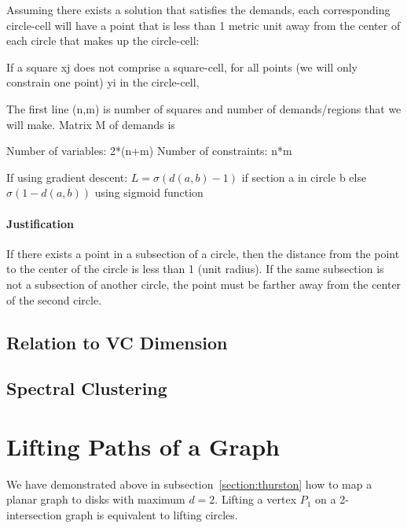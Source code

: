 \documentclass{NSF}
\begin{document}
\begin{figure}[ht]
\caption{
}
\label{fig:convex-opt}
\end{figure}

Assuming there exists a solution that satisfies the demands, each corresponding circle-cell will have a point that is less than 1 metric unit away from the center of each circle that makes up the circle-cell:

If a square xj does not comprise a square-cell, for all points (we will only constrain one point) yi in the circle-cell,


The first line (n,m) is number of squares and number of demands/regions that we will make.
Matrix M of demands is 


Number of variables: 2*(n+m)
Number of constraints: n*m

If using gradient descent: $L = \sigma(d(a,b)-1)$ if section a in circle b else $\sigma(1-d(a,b))$ using sigmoid function


\paragraph{Justification}
If there exists a point in a subsection of a circle, then the distance from the point to the center of the circle is less than 1 (unit radius). If the same subsection is not a subsection of another circle, the point must be farther away from the center of the second circle.

\subsection{Relation to VC Dimension}

\subsection{Spectral Clustering}

\section{Lifting Paths of a Graph}
We have demonstrated above in subsection~\ref{section:thurston} how to map a planar graph to disks with maximum $d=2$. Lifting a vertex $P_1$ on a 2-intersection graph is  equivalent to lifting circles.
\end{document}
